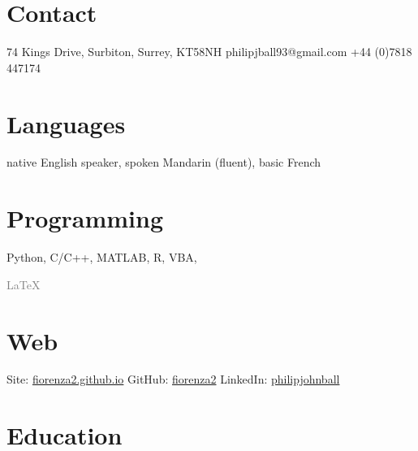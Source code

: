 \documentclass[]{friggeri-cv} %
\begin{document}



\begin{aside} %
\section{Contact}
74 Kings Drive, Surbiton, Surrey, KT58NH
philipjball93@gmail.com
+44 (0)7818 447174
\section{Languages}
native English speaker,
spoken Mandarin (fluent),
basic French
\section{Programming}
Python, C/C++, MATLAB, R, VBA, \textcolor{gray}{\begin{myfont}\LaTeX\ \end{myfont}}
\section{Web}
Site: \href{https://fiorenza2.github.io}{fiorenza2.github.io}
GitHub: \href{https://github.com/fiorenza2}{fiorenza2}
LinkedIn: \href{https://uk.linkedin.com/in/philipjohnball}{philipjohnball}
\end{aside}


\section{Education}
\end{document}
